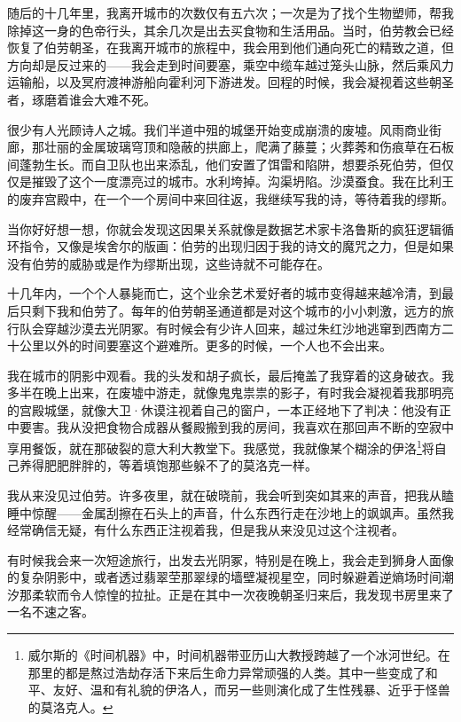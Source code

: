 \documentclass[AutoFakeBold=true]{book}
\begin{document}
随后的十几年里，我离开城市的次数仅有五六次；一次是为了找个生物塑师，帮我除掉这一身的色帝行头，其余几次是出去买食物和生活用品。当时，伯劳教会已经恢复了伯劳朝圣，在我离开城市的旅程中，我会用到他们通向死亡的精致之道，但方向却是反过来的——我会走到时间要塞，乘空中缆车越过笼头山脉，然后乘风力运输船，以及冥府渡神游船向霍利河下游进发。回程的时候，我会凝视着这些朝圣者，琢磨着谁会大难不死。

很少有人光顾诗人之城。我们半道中殂的城堡开始变成崩溃的废墟。风雨商业街廊，那壮丽的金属玻璃穹顶和隐蔽的拱廊上，爬满了藤蔓；火葬莠和伤痕草在石板间蓬勃生长。而自卫队也出来添乱，他们安置了饵雷和陷阱，想要杀死伯劳，但仅仅是摧毁了这个一度漂亮过的城市。水利垮掉。沟渠坍陷。沙漠蚕食。我在比利王的废弃宫殿中，在一个一个房间中来回往返，我继续写我的诗，等待着我的缪斯。

\vspace*{1em}

当你好好想一想，你就会发现这因果关系就像是数据艺术家卡洛鲁斯的疯狂逻辑循环指令，又像是埃舍尔的版画：伯劳的出现归因于我的诗文的魔咒之力，但是如果没有伯劳的威胁或是作为缪斯出现，这些诗就不可能存在。

十几年内，一个个人暴毙而亡，这个业余艺术爱好者的城市变得越来越冷清，到最后只剩下我和伯劳了。每年的伯劳朝圣通道都是对这个城市的小小刺激，远方的旅行队会穿越沙漠去光阴冢。有时候会有少许人回来，越过朱红沙地逃窜到西南方二十公里以外的时间要塞这个避难所。更多的时候，一个人也不会出来。

我在城市的阴影中观看。我的头发和胡子疯长，最后掩盖了我穿着的这身破衣。我多半在晚上出来，在废墟中游走，就像鬼鬼祟祟的影子，有时我会凝视着我那明亮的宫殿城堡，就像大卫·休谟注视着自己的窗户，一本正经地下了判决：他没有正中要害。我从没把食物合成器从餐殿搬到我的房间，我喜欢在那回声不断的空寂中享用餐饭，就在那破裂的意大利大教堂下。我感觉，我就像某个糊涂的伊洛\footnote{威尔斯的《时间机器》中，时间机器带亚历山大教授跨越了一个冰河世纪。在那里的都是熬过浩劫存活下来后生命力异常顽强的人类。其中一些变成了和平、友好、温和有礼貌的伊洛人，而另一些则演化成了生性残暴、近乎于怪兽的莫洛克人。}将自己养得肥肥胖胖的，等着填饱那些躲不了的莫洛克一样。

我从来没见过伯劳。许多夜里，就在破晓前，我会听到突如其来的声音，把我从瞌睡中惊醒——金属刮擦在石头上的声音，什么东西行走在沙地上的飒飒声。虽然我经常确信无疑，有什么东西正注视着我，但是我从来没见过这个注视者。

有时候我会来一次短途旅行，出发去光阴冢，特别是在晚上，我会走到狮身人面像的复杂阴影中，或者透过翡翠茔那翠绿的墙壁凝视星空，同时躲避着逆熵场时间潮汐那柔软而令人惊惶的拉扯。正是在其中一次夜晚朝圣归来后，我发现书房里来了一名不速之客。
\end{document}
